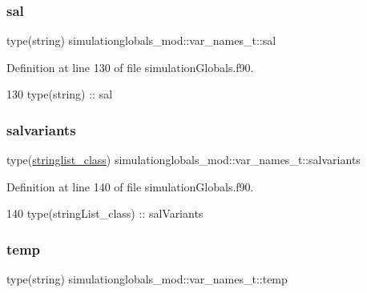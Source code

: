 \subsubsection{\texorpdfstring{sal}{sal}}
{\footnotesize\ttfamily type(string) simulationglobals\+\_\+mod\+::var\+\_\+names\+\_\+t\+::sal\hspace{0.3cm}{\ttfamily [private]}}



Definition at line 130 of file simulation\+Globals.\+f90.


\begin{DoxyCode}
130         \textcolor{keywordtype}{type}(string) :: sal
\end{DoxyCode}
\mbox{\label{structsimulationglobals__mod_1_1var__names__t_a9838f6b9586a4484a58764c03a6d9728}} 
\subsubsection{\texorpdfstring{salvariants}{salvariants}}
{\footnotesize\ttfamily type(\mbox{\hyperlink{structsimulationglobals__mod_1_1stringlist__class}{stringlist\+\_\+class}}) simulationglobals\+\_\+mod\+::var\+\_\+names\+\_\+t\+::salvariants\hspace{0.3cm}{\ttfamily [private]}}



Definition at line 140 of file simulation\+Globals.\+f90.


\begin{DoxyCode}
140         \textcolor{keywordtype}{type}(stringList\_class) :: salVariants
\end{DoxyCode}
\mbox{\label{structsimulationglobals__mod_1_1var__names__t_a2b8a91d6d50fa1312daa7b33447a1f23}} 
\subsubsection{\texorpdfstring{temp}{temp}}
{\footnotesize\ttfamily type(string) simulationglobals\+\_\+mod\+::var\+\_\+names\+\_\+t\+::temp\hspace{0.3cm}{\ttfamily [private]}}



